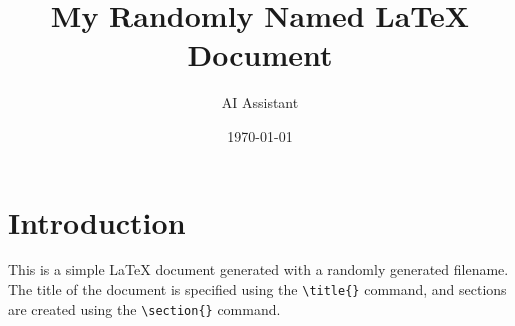\documentclass{article}
\title{My Randomly Named LaTeX Document}
\author{AI Assistant}
\date{\today}
\begin{document}
\maketitle

\section{Introduction}
This is a simple LaTeX document generated with a randomly generated filename. The title of the document is specified using the \texttt{\textbackslash title\{\}} command, and sections are created using the \texttt{\textbackslash section\{\}} command.
\end{document}
